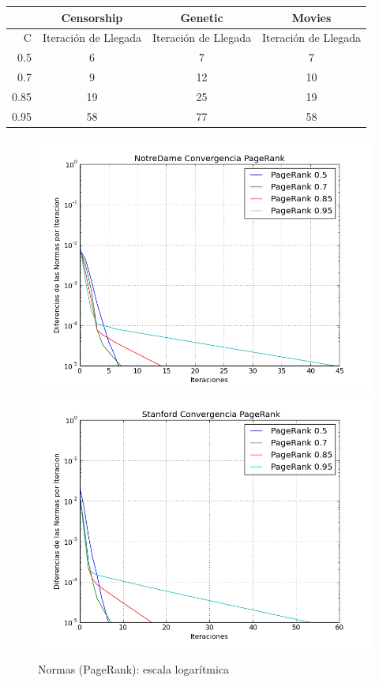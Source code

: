 \documentclass[a4paper]{article}
\begin{document}
\begin{center}
\begin{tabular}{r|c|c|c}
&  \textbf{Censorship} & \textbf{Genetic} & \textbf{Movies} \\ 
\hline
C & Iteración de Llegada & Iteración de Llegada & Iteración de Llegada\\
\hline
0.5 & 6 & 7 & 7\\
\hline
0.7 & 9 & 12 & 10\\
\hline
0.85 & 19 & 25 & 19\\
\hline
0.95 & 58 & 77 & 58
\end{tabular}
\end{center}


\begin{figure}[htbp]
\centering
\includegraphics[scale=0.35]{img/Normas-Page-Notre.png}
\includegraphics[scale=0.35]{img/Norma-Page-Stanford.png}
\caption{Normas (PageRank): escala logarítmica}
\end{figure}
\end{document}
